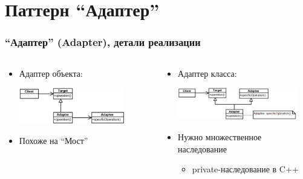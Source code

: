 \documentclass[xetex,mathserif,serif]{beamer}
\begin{document}
	\section{Паттерн ``Адаптер''}

	\begin{frame}
		\frametitle{``Адаптер'' (Adapter), детали реализации}
		\begin{columns}
			\begin{column}{0.5\textwidth}
				\begin{itemize}
					\item Адаптер объекта:
						\vspace{0.3cm}
						
						\includegraphics[width=0.8\textwidth]{objectAdapter.png}
						\vspace{0.3cm}
					\item Похоже на ``Мост''
				\end{itemize}
			\end{column}
			\begin{column}{0.5\textwidth}
				\begin{itemize}
					\item Адаптер класса:
						\vspace{0.3cm}
						
						\includegraphics[width=0.9\textwidth]{classAdapter.png}
						\vspace{0.3cm}
					\item Нужно множественное наследование
					\begin{itemize}
						\item private-наследование в C++
					\end{itemize}
				\end{itemize}
			\end{column}
		\end{columns}
	\end{frame}
\end{document}
